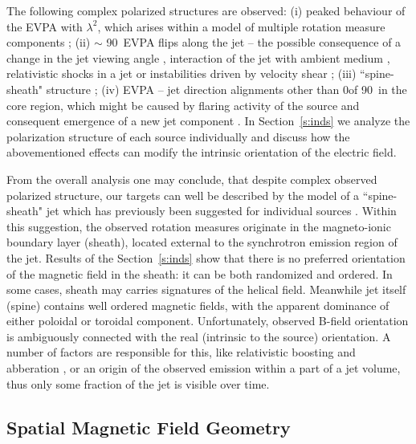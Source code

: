\documentclass[a4paper,fleqn,usenatbib,useAMS]{mnras}
\begin{document}
The following complex polarized structures are observed: (i) peaked behaviour of the EVPA with $\lambda^2$, which arises within a model of multiple rotation measure components \citep{gl_84}; (ii) $\sim$ 90\degr\ EVPA flips along the jet -- the possible consequence of a change in the jet viewing angle \citep{lyutikov_etal05}, interaction of the jet with ambient medium \citep{1999ApJ...518L..87A}, relativistic shocks in a jet \citep{1994ApJ...437..108B,1994ApJ...437..122W} or instabilities driven by velocity shear \citep{2004ApSS.293..117H}; (iii) ``spine-sheath" structure \citep{1996ASPC..100..241L,2007ApJ...662..835M}; (iv) EVPA -- jet direction alignments other than 0\degr of 90\degr\ in the core region, which might be caused by flaring activity of the source and consequent emergence of a new jet component \citep[e.g.][]{1994ApJ...437..108B,2016MNRAS.462.2747K}.
In Section~\ref{s:inds} we analyze the polarization structure of each source individually and discuss how the abovementioned effects can modify the intrinsic orientation of the electric field.

From the overall analysis one may conclude, that despite complex observed polarized structure, our targets can well be described by the model of a ``spine-sheath" jet \citep{1996ASPC..100..241L,1999ApJ...518L..87A,2007ApJ...662..835M} which has previously been suggested for individual sources \citep[e.g.][]{2008ApJ...682..798A,asada_etal10}. Within this suggestion, the observed rotation measures originate in the magneto-ionic boundary layer (sheath), located external to the synchrotron emission region of the jet. Results of the Section~\ref{s:inds} show that there is no preferred orientation of the magnetic field in the sheath: it can be both randomized and ordered. In some cases, sheath may carries signatures of the helical field. Meanwhile jet itself (spine) contains well ordered magnetic fields, with the apparent dominance of either poloidal or toroidal component.
Unfortunately, observed B-field orientation is ambiguously connected with the real (intrinsic to the source) orientation. 
A number of factors are responsible for this, like relativistic boosting and abberation \citep{lyutikov_etal05}, or an origin of the observed emission within a part of a jet volume, thus only some fraction of the jet is visible over time.


\subsection{Spatial Magnetic Field Geometry}
\label{s:3dmet}
\end{document}
